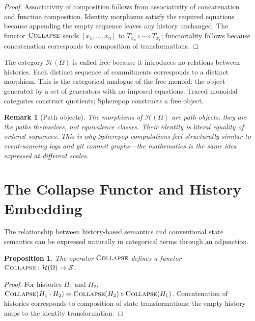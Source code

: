 \documentclass[12pt]{article}
\newtheorem{proposition}{Proposition}[section]
\newtheorem{remark}{Remark}[section]
\newcommand{\Collapse}{\operatorname{\textsc{Collapse}}}
\newcommand{\History}{\mathcal{H}}
\newcommand{\Option}{\Omega}
\newcommand{\State}{\mathcal{S}}
\newcommand{\Seq}[1]{\left[#1\right]}
\newcommand{\Append}{\mathbin{\cdot}}
\begin{document}
\begin{proof}
Associativity of composition follows from associativity of concatenation and function composition. Identity morphisms satisfy the required equations because appending the empty sequence leaves any history unchanged. The functor $\Collapse$ sends $\Seq{x_1,\ldots,x_n}$ to $T_{x_n} \circ \cdots \circ T_{x_1}$; functoriality follows because concatenation corresponds to composition of transformations.
\end{proof}

The category $\History(\Option)$ is called free because it introduces no relations between histories. Each distinct sequence of commitments corresponds to a distinct morphism. This is the categorical analogue of the free monoid: the object generated by a set of generators with no imposed equations. Traced monoidal categories construct quotients; Spherepop constructs a free object.

\begin{remark}[Path objects]
The morphisms of $\History(\Option)$ are path objects: they are the paths themselves, not equivalence classes. Their identity is literal equality of ordered sequences. This is why Spherepop computations feel structurally similar to event-sourcing logs and git commit graphs---the mathematics is the same idea expressed at different scales.
\end{remark}

\section{The Collapse Functor and History Embedding}
\label{sec:adjunction}

The relationship between history-based semantics and conventional state semantics can be expressed naturally in categorical terms through an adjunction.

\begin{proposition}
The operator $\Collapse$ defines a functor $\Collapse : \History(\Option) \to \State$.
\end{proposition}

\begin{proof}
For histories $H_1$ and $H_2$, $\Collapse(H_1 \Append H_2) = \Collapse(H_2) \circ \Collapse(H_1)$. Concatenation of histories corresponds to composition of state transformations; the empty history maps to the identity transformation.
\end{proof}
\end{document}
